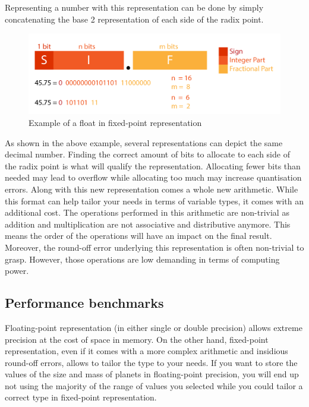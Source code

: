 Representing a number with this representation can be done by simply concatenating the base 2 representation of each side of the radix point.

\begin{figure}[htbp]
	\centering
		\includegraphics[width=12cm]{Figures/FixedPoint.png}
	\caption[Fixed-Point Representation]{Example of a float in fixed-point representation}
	\label{fig:FixedPoint}
\end{figure}

As shown in the above example, several representations can depict the same decimal number. Finding the correct amount of bits to allocate to each side of the radix point is what will qualify the representation. Allocating fewer bits than needed may lead to overflow while allocating too much may increase quantisation errors.
Along with this new representation comes a whole new arithmetic. While this format can help tailor your needs in terms of variable types, it comes with an additional cost. The operations performed in this arithmetic are non-trivial as addition and multiplication are not associative and distributive anymore. This means the order of the operations will have an impact on the final result. Moreover, the round-off error underlying this representation is often non-trivial to grasp. However, those operations are low demanding in terms of computing power.

\subsection{Performance benchmarks}

Floating-point representation (in either single or double precision) allows extreme precision at the cost of space in memory. On the other hand, fixed-point representation, even if it comes with a more complex arithmetic and insidious round-off errors, allows to tailor the type to your needs. If you want to store the values of the size and mass of planets in floating-point precision, you will end up not using the majority of the range of values you selected while you could tailor a correct type in fixed-point representation.

